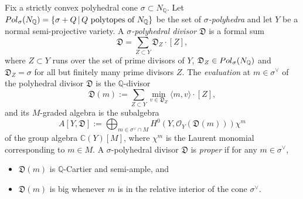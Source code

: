 \documentclass[11pt, reqno]{amsart}
\theoremstyle{plain}
\theoremstyle{definition}
\theoremstyle{remark}
\begin{document}
Fix a strictly convex polyhedral cone $\sigma\subset  N_{\mathbb{Q}}$. Let
${\rm Pol}_{\sigma}(N_{\mathbb{Q}}) =  \{ \sigma + Q\, |\, Q \text{ polytopes of } N_{\mathbb{Q}}\}$
be the set of \emph{$\sigma$-polyhedra} and  let $Y$ be a normal semi-projective variety. A \emph{$\sigma$-polyhedral divisor} $\mathfrak{D}$ is a formal sum 
$$\mathfrak{D} = \sum_{Z\subset Y} \mathfrak{D}_{Z}\cdot [Z],$$
where $Z\subset Y$ runs over the set of prime divisors of $Y$, $\mathfrak{D}_{Z}\in {\rm Pol}_{\sigma}(N_{\mathbb{Q}})$
and $\mathfrak{D}_{Z} =  \sigma$ for all but finitely many prime divisors $Z$. The \emph{evaluation} at $m\in\sigma^{\vee}$ of the polyhedral divisor $\mathfrak{D}$
is the $\mathbb{Q}$-divisor 
$$\mathfrak{D}(m) :=  \sum_{Z\subset Y} \min_{v\in \mathfrak{D}_{Z}}\langle m, v\rangle \cdot [Z],$$
and its $M$-graded algebra is the subalgebra 
$$A[Y, \mathfrak{D}]:= \bigoplus_{m\in\sigma^{\vee}\cap M} H^{0}(Y, \mathcal{O}_{Y}(\mathfrak{D}(m)))\chi^{m}$$
of the group algebra $\mathbb{C}(Y)[M]$, where $\chi^{m}$ is the Laurent monomial corresponding to $m\in M$. A $\sigma$-polyhedral divisor $\mathfrak{D}$ is \emph{proper} if for any $m\in\sigma^{\vee}$,
\begin{itemize}
\item[(i)] $\mathfrak{D}(m)$ is $\mathbb{Q}$-Cartier and semi-ample, and 
\item[(ii)] $\mathfrak{D}(m)$ is big whenever $m$ is in the relative interior of the cone $\sigma^{\vee}$.
\end{itemize}
\
\end{document}
